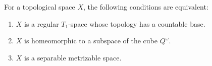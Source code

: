 For a topological space $X$, the following conditions are equivalent:
\begin{enumerate}
\item[(a)] $X$ is a regular $T_1$-space whose topology has a countable base.
\item[(b)] $X$ is homeomorphic to a subspace of the cube $Q^\omega$.
\item[(c)] $X$ is a separable metrizable space.
\end{enumerate}
